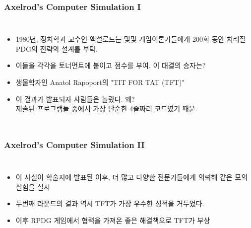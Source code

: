 \documentclass[final]{beamer}
\begin{document}
\begin{frame}\frametitle{Axelrod's Computer Simulation I}\vspace{1em}
\begin{columns}[c]
\column{19em}
\begin{itemize}
\item 1980년, 정치학과 교수인 액설로드는 몇몇 게임이론가들에게 200회 동안 치러질 PDG의 전략의 설계를 부탁. 
\item 이들을 각각을 토너먼트에 붙이고 점수를 부여. 이 대결의 승자는? 
\item 생물학자인 Anatol Rapoport의 "TIT FOR TAT (TFT)" 
\item 이 결과가 발표되자 사람들은 놀랐다. 왜?
\\ 제출된 프로그램들 중에서 가장 단순한 4줄짜리 코드였기 때문. 
\end{itemize}
\column{11em}
\end{columns}
\end{frame}

\begin{frame}\frametitle{Axelrod's Computer Simulation II}\vspace{2em}
\begin{columns}[c]
\column{17em}
\begin{itemize}
\item 이 사실이 학술지에 발표된 이후, 더 많고 다양한 전문가들에게 의뢰해 같은 모의 실험을 실시 
\item 두번째 라운드의 결과 역시 TFT가 가장 우수한 성적을 거두었다. 
\item 이후 RPDG 게임에서 협력을 가져온 좋은 해결책으로 TFT가 부상 
\end{itemize}
\column{13em}
\hspace{-1em}
\end{columns}
\end{frame}
\end{document}
